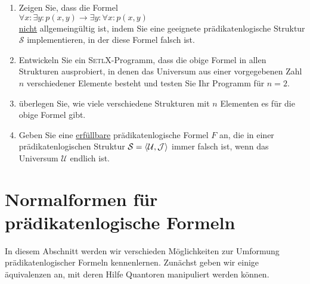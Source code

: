 \exercise
\begin{enumerate}
\item Zeigen Sie, dass die Formel
      \\[0.2cm]
      \hspace*{1.3cm}
      $\forall x: \exists y: p(x,y) \rightarrow \exists y: \forall x: p(x,y)$
      \\[0.2cm]
      \underline{nicht} allgemeing\"{u}ltig ist, indem Sie eine geeignete pr\"{a}dikatenlogische Struktur
      $\mathcal{S}$ implementieren, in der diese Formel falsch ist.
\item Entwickeln Sie ein \textsc{SetlX}-Programm, dass die obige Formel in allen Strukturen
      ausprobiert, in denen das Universum  aus einer vorgegebenen Zahl $n$ verschiedener Elemente
      besteht und testen Sie Ihr Programm f\"{u}r $n=2$.
\item \"{u}berlegen Sie, wie viele verschiedene Strukturen mit $n$ Elementen es f\"{u}r die obige Formel gibt.
\item Geben Sie eine \underline{erf\"{u}llbare} pr\"{a}dikatenlogische Formel $F$ an, die in einer pr\"{a}dikatenlogischen
      Struktur $\mathcal{S} = \pair(\mathcal{U},\mathcal{J})$ immer falsch ist, wenn das Universum
      $\mathcal{U}$ endlich ist.  \exend  
\end{enumerate}

\section{Normalformen f\"{u}r pr\"{a}dikatenlogische Formeln}
In diesem Abschnitt werden wir verschieden M\"{o}glichkeiten zur Umformung pr\"{a}dikatenlogischer Formeln
kennenlernen.  Zun\"{a}chst geben wir einige \"{a}quivalenzen an, mit deren Hilfe Quantoren manipuliert werden k\"{o}nnen.

